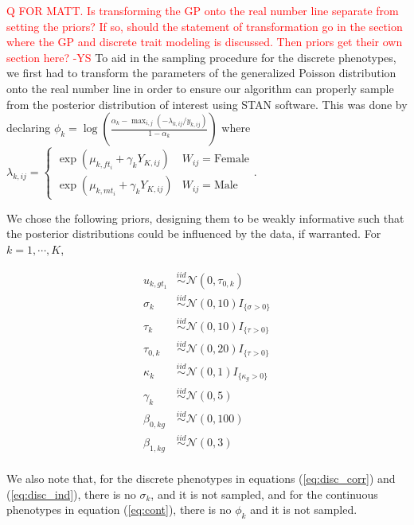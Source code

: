 \documentclass[
  12pt,
]{article}
\begin{document}
\textcolor{red}{Q FOR MATT. Is transforming the GP onto the real number line separate from setting the priors? If so, should the statement of transformation go in the section where the GP and discrete trait modeling is discussed. Then priors get their own section here? -YS}
To aid in the sampling procedure for the discrete phenotypes, we first
had to transform the parameters of the generalized Poisson distribution
onto the real number line in order to ensure our algorithm can properly
sample from the posterior distribution of interest using STAN software.
This was done by declaring
\(\phi_k = \log\left(\frac{\alpha_k - \max_{i,j}(-\lambda_{k,ij}/y_{k,ij})}{1 - \alpha_k}\right)\)
where
\(\lambda_{k,ij} = \left\{\begin{array}{cc} \exp(\mu_{k,ft_i} + \gamma_k Y_{K,ij}) & W_{ij} = \text{Female} \\ \exp(\mu_{k,mt_i} + \gamma_k Y_{K,ij}) & W_{ij} = \text{Male} \end{array}\right.\).

We chose the following priors, designing them to be weakly informative
such that the posterior distributions could be influenced by the data,
if warranted. For \(k = 1,\cdots,K\),

\begin{align}
u_{k,gt_1} & \overset{iid}{\sim}\mathcal{N}(0,\tau_{0,k}) \nonumber \\
\sigma_k & \overset{iid}{\sim}\mathcal{N}(0,10)I_{\{\sigma > 0\}} \nonumber \\
\tau_k & \overset{iid}{\sim}\mathcal{N}(0,10)I_{\{\tau > 0\}} \nonumber \\
\tau_{0,k} & \overset{iid}{\sim}\mathcal{N}(0,20)I_{\{\tau > 0\}} \nonumber \\
\kappa_k & \overset{iid}{\sim}\mathcal{N}(0,1)I_{\{\kappa_g > 0\}} \nonumber \\
\gamma_{k} & \overset{iid}{\sim}\mathcal{N}(0,5) \nonumber \\
\beta_{0,kg} & \overset{iid}{\sim}\mathcal{N}(0,100) \nonumber \\
\beta_{1,kg} & \overset{iid}{\sim}\mathcal{N}(0,3) \nonumber \\
\label{eq:priors}
\end{align}

We also note that, for the discrete phenotypes in equations
(\ref{eq:disc_corr}) and (\ref{eq:disc_ind}), there is no \(\sigma_k\),
and it is not sampled, and for the continuous phenotypes in equation
(\ref{eq:cont}), there is no \(\phi_k\) and it is not sampled.
\end{document}
